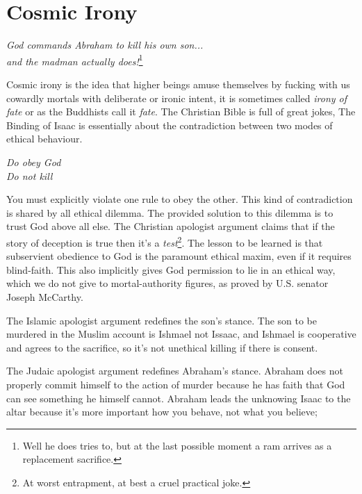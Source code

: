 \newpage
\section{Cosmic Irony}


\begin{center}
\textit{God commands Abraham to kill his own son...\\ and the madman actually does!}\footnote{Well he does tries to, but at the last possible moment a ram arrives as a replacement sacrifice.}
\end{center}

Cosmic irony is the idea that higher beings amuse themselves by fucking with us cowardly mortals with deliberate or ironic intent, it is sometimes called \textit{irony of fate} or as the Buddhists call it \textit{fate}. The Christian Bible is full of great jokes, The Binding of Isaac is essentially about the contradiction between two modes of ethical behaviour.

\begin{center}
\textit{Do obey God} \\
\textit{Do not kill}
\end{center}

You must explicitly violate one rule to obey the other. This kind of contradiction is shared by all ethical dilemma. The provided solution to this dilemma is to trust God above all else. The Christian apologist argument claims that if the story of deception is true then it's a \textit{test}\footnote{At worst entrapment, at best a cruel practical joke.}. The lesson to be learned is that subservient obedience to God is the paramount ethical maxim, even if it requires blind-faith. This also implicitly gives God permission to lie in an ethical way, which we do not give to mortal-authority figures, as proved by U.S. senator Joseph McCarthy. 

The Islamic apologist argument redefines the son's stance. The son to be murdered in the Muslim account is Ishmael not Issaac, and Ishmael is cooperative and agrees to the sacrifice, so it's not unethical killing if there is consent. %

The Judaic apologist argument redefines Abraham's stance. Abraham does not properly commit himself to the action of murder because he has faith that God can see something he himself cannot. Abraham leads the unknowing Isaac to the altar because it's more important how you behave, not what you believe; 

